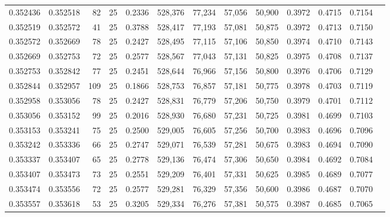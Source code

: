 \begin{tabular}{rrrrrrrrrrrrr}
0.352436 & 0.352518 &    82 &  25 &                                     0.2336 & 528,376 &  77,234 &  57,056 &  50,900 & 0.3972 & 0.4715 & 0.7154 \\
0.352519 & 0.352572 &    41 &  25 &                                     0.3788 & 528,417 &  77,193 &  57,081 &  50,875 & 0.3972 & 0.4713 & 0.7150 \\
0.352572 & 0.352669 &    78 &  25 &                                     0.2427 & 528,495 &  77,115 &  57,106 &  50,850 & 0.3974 & 0.4710 & 0.7143 \\
0.352669 & 0.352753 &    72 &  25 &                                     0.2577 & 528,567 &  77,043 &  57,131 &  50,825 & 0.3975 & 0.4708 & 0.7137 \\
0.352753 & 0.352842 &    77 &  25 &                                     0.2451 & 528,644 &  76,966 &  57,156 &  50,800 & 0.3976 & 0.4706 & 0.7129 \\
0.352844 & 0.352957 &   109 &  25 &                                     0.1866 & 528,753 &  76,857 &  57,181 &  50,775 & 0.3978 & 0.4703 & 0.7119 \\
0.352958 & 0.353056 &    78 &  25 &                                     0.2427 & 528,831 &  76,779 &  57,206 &  50,750 & 0.3979 & 0.4701 & 0.7112 \\
0.353056 & 0.353152 &    99 &  25 &                                     0.2016 & 528,930 &  76,680 &  57,231 &  50,725 & 0.3981 & 0.4699 & 0.7103 \\
0.353153 & 0.353241 &    75 &  25 &                                     0.2500 & 529,005 &  76,605 &  57,256 &  50,700 & 0.3983 & 0.4696 & 0.7096 \\
0.353242 & 0.353336 &    66 &  25 &                                     0.2747 & 529,071 &  76,539 &  57,281 &  50,675 & 0.3983 & 0.4694 & 0.7090 \\
0.353337 & 0.353407 &    65 &  25 &                                     0.2778 & 529,136 &  76,474 &  57,306 &  50,650 & 0.3984 & 0.4692 & 0.7084 \\
0.353407 & 0.353473 &    73 &  25 &                                     0.2551 & 529,209 &  76,401 &  57,331 &  50,625 & 0.3985 & 0.4689 & 0.7077 \\
0.353474 & 0.353556 &    72 &  25 &                                     0.2577 & 529,281 &  76,329 &  57,356 &  50,600 & 0.3986 & 0.4687 & 0.7070 \\
0.353557 & 0.353618 &    53 &  25 &                                     0.3205 & 529,334 &  76,276 &  57,381 &  50,575 & 0.3987 & 0.4685 & 0.7065 \\

\end{tabular}
